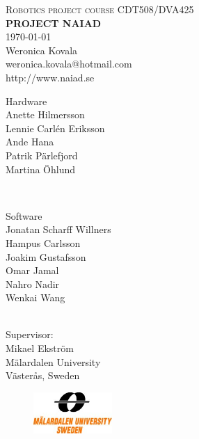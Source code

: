 \begin{center}
\LARGE \textsc{Robotics project course CDT508/DVA425} 	%
		 	\\[1.0cm]
			\huge \textbf{\uppercase{Project Naiad}} \\
			\Large \today \\[1.0cm]				
			\LARGE Weronica Kovala  \\	
        			\large weronica.kovala@hotmail.com \\
        			\large http://www.naiad.se\\[1.0cm]
        			
\begin{minipage}{0.4\textwidth}
\begin{flushleft} \large
\normalsize Hardware \\
\Large Anette Hilmersson \\
\large Lennie Carlén Eriksson \\
Ande Hana \\
Patrik Pärlefjord \\
Martina Öhlund \\%
\vspace{15pt}

\end{flushleft}
\end{minipage}
~
\begin{minipage}{0.4\textwidth}
\begin{flushright} \large
\normalsize Software \\
\Large Jonatan Scharff Willners \\
\large Hampus Carlsson \\
Joakim Gustafsson \\
Omar Jamal \\
Nahro Nadir \\
Wenkai Wang
\end{flushright}
\end{minipage}\\[3cm]

			\LARGE Supervisor:\\	
        	\LARGE Mikael Ekström \\[1.0cm]
			\LARGE Mälardalen University\\
			\LARGE Västerås, Sweden
		\begin{figure}[b]	
				\includegraphics[width=30mm]{./Images/f_rg_logo_eng_SWEDEN_tall_.jpg}
		\end{figure}
\end{center}

